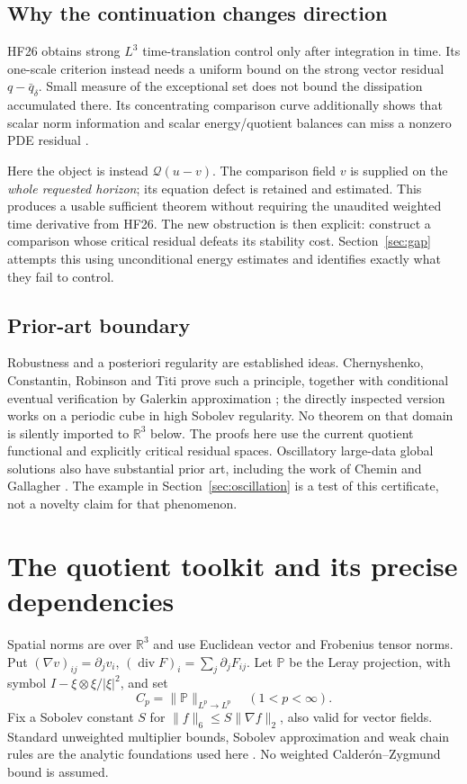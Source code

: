 \documentclass[11pt,a4paper]{article}
\theoremstyle{definition}\newtheorem{definition}[theorem]{Definition}
\theoremstyle{remark}\newtheorem{remark}[theorem]{Remark}
\newcommand{\R}{\mathbb R}
\newcommand{\Q}{\mathcal Q}
\newcommand{\PP}{\mathbb P}
\newcommand{\norm}[1]{\lVert #1\rVert}
\newcommand{\diver}{\operatorname{div}}
\numberwithin{equation}{section}
\begin{document}
\subsection{Why the continuation changes direction}
HF26 obtains strong $L^3$ time-translation control only after integration in time. Its one-scale criterion instead needs a uniform bound on the strong vector residual $q-\bar q_\delta$. Small measure of the exceptional set does not bound the dissipation accumulated there. Its concentrating comparison curve additionally shows that scalar norm information and scalar energy/quotient balances can miss a nonzero PDE residual \cite{HF26}.

Here the object is instead $\Q(u-v)$. The comparison field $v$ is supplied on the \emph{whole requested horizon}; its equation defect is retained and estimated. This produces a usable sufficient theorem without requiring the unaudited weighted time derivative from HF26. The new obstruction is then explicit: construct a comparison whose critical residual defeats its stability cost. Section~\ref{sec:gap} attempts this using unconditional energy estimates and identifies exactly what they fail to control.

\subsection{Prior-art boundary}
Robustness and a posteriori regularity are established ideas. Chernyshenko, Constantin, Robinson and Titi prove such a principle, together with conditional eventual verification by Galerkin approximation \cite{CCRT}; the directly inspected version works on a periodic cube in high Sobolev regularity. No theorem on that domain is silently imported to $\R^3$ below. The proofs here use the current quotient functional and explicitly critical residual spaces. Oscillatory large-data global solutions also have substantial prior art, including the work of Chemin and Gallagher \cite{CG}. The example in Section~\ref{sec:oscillation} is a test of this certificate, not a novelty claim for that phenomenon.

\section{The quotient toolkit and its precise dependencies}
\label{sec:toolkit}
Spatial norms are over $\R^3$ and use Euclidean vector and Frobenius tensor norms. Put $(\nabla v)_{ij}=\partial_jv_i$, $(\diver F)_i=\sum_j\partial_jF_{ij}$. Let $\PP$ be the Leray projection, with symbol $I-\xi\otimes\xi/|\xi|^2$, and set
\[
 C_p=\norm{\PP}_{L^p\to L^p}\quad(1<p<\infty).
\]
Fix a Sobolev constant $S$ for $\norm f_6\le S\norm{\nabla f}_2$, also valid for vector fields. Standard unweighted multiplier bounds, Sobolev approximation and weak chain rules are the analytic foundations used here \cite{Stein,Brezis}. No weighted Calder\'on--Zygmund bound is assumed.
\end{document}
